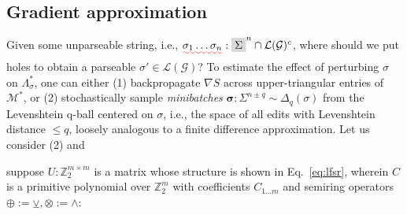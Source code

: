 \documentclass[sigplan,nonacm,anonymous]{acmart}\settopmatter{printfolios=false,printccs=false,printacmref=false}
\begin{document}

  \subsection{Gradient approximation}

  Given some unparseable string, i.e., $\squiggly{\sigma_1\ldots\sigma_n}: \highlight{\Sigma}^n \cap\mathcal{L}(\mathcal{G})^c$, where should we put holes to obtain a parseable $\sigma' \in \mathcal{L}(\mathcal{G})$? To estimate the effect of perturbing $\sigma$ on $\Lambda_\sigma^*$, one can either (1) backpropagate $\nabla S$ across upper-triangular entries of $\mathcal{M}^*$, or (2) stochastically sample \textit{minibatches} $\bm{\sigma}:\Sigma^{n\pm q}\sim\Delta_{q}(\sigma)$ from the Levenshtein q-ball centered on $\sigma$, i.e., the space of all edits with Levenshtein distance $\leq q$, loosely analogous to a finite difference approximation. Let us consider (2) and %
%


  \noindent suppose $U: \mathbb{Z}_2^{m\times m}$ is a matrix whose structure is shown in Eq.~\ref{eq:lfsr}, wherein $C$ is a primitive polynomial over $\mathbb{Z}_2^m$ with coefficients $C_{1\ldots m}$ and semiring operators $\oplus := \veebar, \otimes := \land$:
\end{document}
